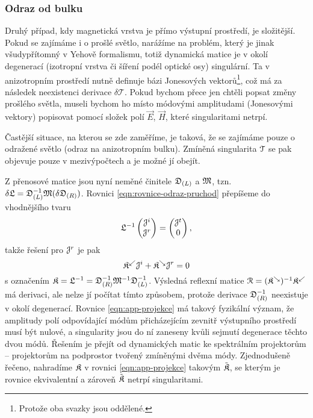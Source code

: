 \subsubsection*{Odraz od bulku}

Druhý případ, kdy magnetická vrstva je přímo výstupní prostředí, je složitější.
Pokud se zajímáme i o prošlé světlo, narážíme na problém, který je jinak všudypřítomný v Yehově formalismu, totiž dynamická matice je v okolí degenerací (izotropní vrstva či šíření podél optické osy) singulární.
Ta v anizotropním prostředí nutně definuje bázi Jonesových vektorů\footnote{Protože oba svazky jsou oddělené.}, což má za následek neexistenci derivace $\delta\mathcal{T}$.
Pokud bychom přece jen chtěli popsat změny prošlého světla, museli bychom ho místo módovými amplitudami (Jonesovými vektory) popisovat pomocí složek polí $\vec{E}$, $\vec{H}$, které singularitami netrpí.

Častější situace, na kterou se zde zaměříme, je taková, že se zajímáme pouze o odražené světlo (odraz na anizotropním bulku).
Zmíněná singularita $\mathcal{T}$ se pak objevuje pouze v mezivýpočtech a je možné jí obejít.

Z přenosové matice jsou nyní neměné činitele $\mathfrak{D}_{(L)}$ a $\mathfrak{M}$, tzn. $\delta\mathfrak{L}=\mathfrak{D}_{(L)}^{-1}\mathfrak{M}(\delta\mathfrak{D}_{(R)})$.
Rovnici \eqref{eqn:rovnice-odraz-pruchod} přepíšeme do vhodnějšího tvaru
\begin{equation}
    \mathfrak{L}^{-1} \begin{pmatrix} \mathcal{J}^i \\ \mathcal{J}^r \end{pmatrix}
    = \begin{pmatrix} \mathcal{J}^t \\ 0 \end{pmatrix} ,
\end{equation}
takže řešení pro $\mathcal{J}^r$ je pak
\begin{equation}
    \label{eqn:app-projekce}
    \mathfrak{K}^\swarrow \mathcal{J}^i + \mathfrak{K}^\searrow \mathcal{J}^r = 0
\end{equation}
s označením $\mathfrak{K}=\mathfrak{L}^{-1} = \mathfrak{D}_{(R)}^{-1}\mathfrak{M}^{-1}\mathfrak{D}_{(L)}^{-1}$.
Výsledná reflexní matice $\mathcal{R}=(\mathfrak{K}^\searrow)^{-1}\mathfrak{K}^\swarrow$ má derivaci, ale nelze jí počítat tímto způsobem, protože derivace $\mathfrak{D}_{(R)}^{-1}$ neexistuje v okolí degenerací.
Rovnice \eqref{eqn:app-projekce} má takový fyzikální význam, že amplitudy polí odpovídající módům přicházejícím zevnitř výstupního prostředí musí být nulové, a singularity jsou do ní zaneseny kvůli sejmutí degenerace těchto dvou módů.
Řešením je přejít od dynamických matic ke spektrálním projektorům -- projektorům na podprostor tvořený zmíněnými dvěma módy.
Zjednodušeně řečeno, nahradíme $\mathfrak{K}$ v rovnici \eqref{eqn:app-projekce} takovým $\tilde{\mathfrak{K}}$, se kterým je rovnice ekvivalentní a zároveň $\tilde{\mathfrak{K}}$ netrpí singularitami.

